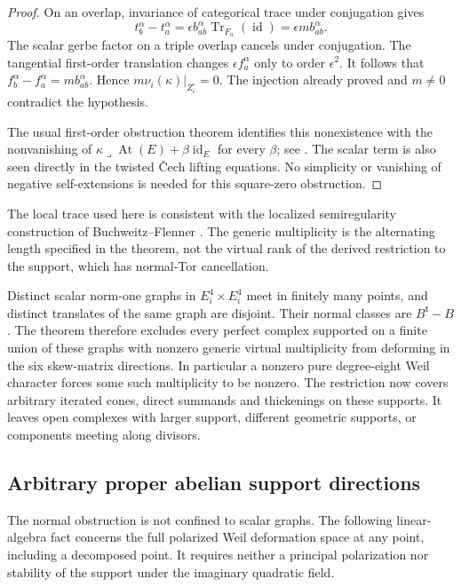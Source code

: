 \documentclass[11pt]{article}
\theoremstyle{definition}
\theoremstyle{remark}
\begin{document}
\begin{proof}
On an overlap, invariance of categorical trace under conjugation gives
\[
 t_b^\alpha-t_a^\alpha
   =\epsilon b_{ab}^\alpha\operatorname{Tr}_{F_a}(\operatorname{id})
   =\epsilon m b_{ab}^\alpha.
\]
The scalar gerbe factor on a triple overlap cancels under conjugation.
The tangential first-order translation changes $\epsilon f_a^\alpha$
only to order $\epsilon^2$. It follows that
$f_b^\alpha-f_a^\alpha=m b_{ab}^\alpha$. Hence
$m\nu_i(\kappa)|_{Z_i^\circ}=0$. The injection already proved and $m\ne0$
contradict the hypothesis.

The usual first-order obstruction theorem identifies this
nonexistence with the nonvanishing of
$\kappa\mathbin{\lrcorner}\operatorname{At}(E)+\beta\operatorname{id}_E$
for every $\beta$; see \cite[Corollary~3.4]{HT}. The scalar term is also
seen directly in the twisted \v Cech lifting equations. No simplicity
or vanishing of negative self-extensions is needed for this square-zero
obstruction.
\end{proof}

The local trace used here is consistent with the localized
semiregularity construction of Buchweitz--Flenner
\cite[Remark~4.7(2), p.~170; Proposition~8.2 and formula~(3),
pp.~200--201]{BF}. The generic multiplicity is the alternating length
specified in the theorem, not the virtual rank of the derived
restriction to the support, which has normal-Tor cancellation.

Distinct scalar norm-one graphs in $E_i^4\times E_i^4$ meet in finitely many points, and distinct translates of the same graph are disjoint. Their normal classes are $B^{\mathsf t}-B$. The theorem therefore excludes every perfect complex supported on a finite union of these graphs with nonzero generic virtual multiplicity from deforming in the six skew-matrix directions. In particular a nonzero pure degree-eight Weil character forces some such multiplicity to be nonzero. The restriction now covers arbitrary iterated cones, direct summands and thickenings on these supports. It leaves open complexes with larger support, different geometric supports, or components meeting along divisors.
\subsection{Arbitrary proper abelian support directions}

The normal obstruction is not confined to scalar graphs.  The following
linear-algebra fact concerns the full polarized Weil deformation space
at any point, including a decomposed point.  It requires neither a
principal polarization nor stability of the support under the
imaginary quadratic field.
\end{document}
